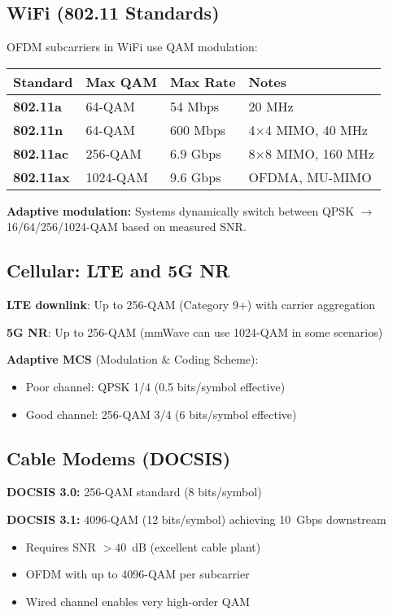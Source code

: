 \subsection{WiFi (802.11 Standards)}

OFDM subcarriers in WiFi use QAM modulation:

{\def\LTcaptype{} %
\begin{longtable}[]{@{}llll@{}}
\toprule\noalign{}
Standard & Max QAM & Max Rate & Notes \\
\midrule\noalign{}
\endhead
\bottomrule\noalign{}
\endlastfoot
\textbf{802.11a} & 64-QAM & 54 Mbps & 20 MHz \\
\textbf{802.11n} & 64-QAM & 600 Mbps & 4$\times$4 MIMO, 40 MHz \\
\textbf{802.11ac} & 256-QAM & 6.9 Gbps & 8$\times$8 MIMO, 160 MHz \\
\textbf{802.11ax} & 1024-QAM & 9.6 Gbps & OFDMA, MU-MIMO \\
\end{longtable}
}

\textbf{Adaptive modulation:} Systems dynamically switch between QPSK $\rightarrow$ 16/64/256/1024-QAM based on measured SNR.

\subsection{Cellular: LTE and 5G NR}

\textbf{LTE downlink}: Up to 256-QAM (Category 9+) with carrier aggregation

\textbf{5G NR}: Up to 256-QAM (mmWave can use 1024-QAM in some scenarios)

\textbf{Adaptive MCS} (Modulation \& Coding Scheme):
\begin{itemize}
\item Poor channel: QPSK 1/4 (0.5 bits/symbol effective)
\item Good channel: 256-QAM 3/4 (6 bits/symbol effective)
\end{itemize}

\subsection{Cable Modems (DOCSIS)}

\textbf{DOCSIS 3.0:} 256-QAM standard (8 bits/symbol)

\textbf{DOCSIS 3.1:} 4096-QAM (12 bits/symbol) achieving 10~Gbps downstream
\begin{itemize}
\item Requires SNR $> 40$~dB (excellent cable plant)
\item OFDM with up to 4096-QAM per subcarrier
\item Wired channel enables very high-order QAM
\end{itemize}

